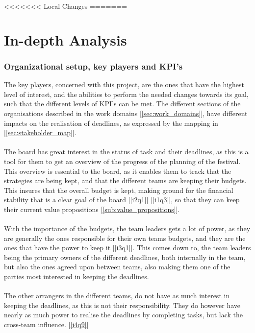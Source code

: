 <<<<<<< Local Changes
=======
\part{In-depth Analysis}
\label{prt:in_depth_analysis}
\section{Organizational setup, key players and KPI's}
The key players, concerned with this project, are the ones that have the highest level of interest, and the abilities to perform the needed changes towards its goal, such that the different levels of KPI's can be met. The different sections of the organisations described in the work domains [\ref{sec:work_domains}], have different impacts on the realisation of deadlines, as expressed by the mapping in [\ref{sec:stakeholder_map}].
\\ \\
The board has great interest in the status of task and their deadlines, as this is a tool for them to get an overview of the progress of the planning of the festival. This overview is essential to the board, as it enables them to track that the strategies are being kept, and that the different teams are keeping their budgets. This insures that the overall budget is kept, making ground for the financial stability that is a clear goal of the board [\ref{i2q1}] [\ref{i1q3}], so that they can keep their current value propositions [\ref{sub:value_propositions}].
\\ \\
With the importance of the budgets, the team leaders gets a lot of power, as they are generally the ones responsible for their own teams budgets, and they are the ones that have the power to keep it [\ref{i3q1}]. This comes down to, the team leaders being the primary owners of the different deadlines, both internally in the team, but also the ones agreed upon between teams, also making them one of the parties most interested in keeping the deadlines.
\\ \\
The other arrangers in the different teams, do not have as much interest in keeping the deadlines, as this is not their responsibility. They do however have nearly as much power to realise the deadlines by completing tasks, but lack the cross-team influence. [\ref{i4q9}]


